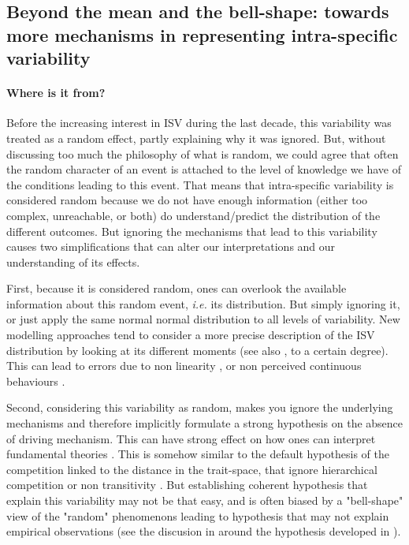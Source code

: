 \subsection{Beyond the mean and the bell-shape: towards more mechanisms in representing intra-specific variability}\label{subsection:bell-shape}

\paragraph{Where is it from?}
Before the increasing interest in ISV during the last decade, this variability was treated as a random effect, partly explaining why it was ignored. But, without discussing too much the philosophy of what is random, we could agree that often the random character of an event is attached to the level of knowledge we have of the conditions leading to this event. That means that intra-specific variability is considered random because we do not have enough information (either too complex, unreachable, or both) do understand/predict the distribution of the different outcomes. But ignoring the mechanisms that lead to this variability causes two simplifications that can alter our interpretations and our understanding of its effects.

First, because it is considered random, ones can overlook the available information about this random event, \textit{i.e.} its distribution. But simply ignoring it, or just apply the same normal normal distribution to all levels of variability. New modelling approaches tend to consider a more precise description of the ISV distribution by looking at its different moments \cite{dewitt_expanding_2016}(see also \cite{barabas_effect_2016}, to a certain degree). This can lead to errors due to non linearity \parencite{bolnick_why_2011, hart_how_2016}, or non perceived continuous behaviours \parencite{courbaud_intra-specific_2010}.

Second, considering this variability as random, makes you ignore the underlying mechanisms and therefore implicitly formulate a strong hypothesis on the absence of driving mechanism. This can have strong effect on how ones can interpret fundamental theories \parencite{turcotte_phenotypic_2016}. This is somehow similar to the default hypothesis of the competition linked to the distance in the trait-space, that ignore hierarchical competition \parencite{kunstler_plant_2016} or non transitivity \parencite{levine_beyond_2017}. But establishing coherent hypothesis that explain this variability may not be that easy, and is often biased by a "bell-shape" view of the "random" phenomenons leading to hypothesis  that may not explain empirical observations (see the discusion in \cite{kichenin_contrasting_2013} around the hypothesis developed in \cite{albert_intraspecific_2010}).


